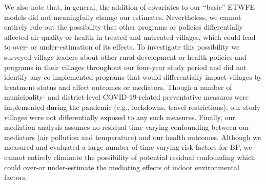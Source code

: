 \documentclass[
  letterpaper,
  DIV=11,
  numbers=noendperiod]{scrartcl}
\begin{document}
We also note that, in general, the addition of covariates to our
``basic'' ETWFE models did not meaningfully change our estimates.
Nevertheless, we cannot entirely rule out the possibility that other
programs or policies differentially affected air quality or health in
treated and untreated villages, which could lead to over- or
under-estimation of its effects. To investigate this possibility we
surveyed village leaders about other rural development or health
policies and programs in their villages throughout our four-year study
period and did not identify any co-implemented programs that would
differentially impact villages by treatment status and affect outcomes
or mediators. Though  a number of municipality- and
district-level COVID-19-related preventative measures were implemented
during the pandemic (e.g., lockdowns, travel restrictions), our study
villages were not differentially exposed to any such measures. Finally,
our mediation analysis assumes no residual time-varying confounding
between our mediators (air pollution and temperature) and our health
outcomes. Although we measured and evaluated a large number of
time-varying risk factors for BP, we cannot entirely eliminate the
possibility of potential residual confounding which could over-or
under-estimate the mediating effects of indoor environmental factors.
\end{document}
